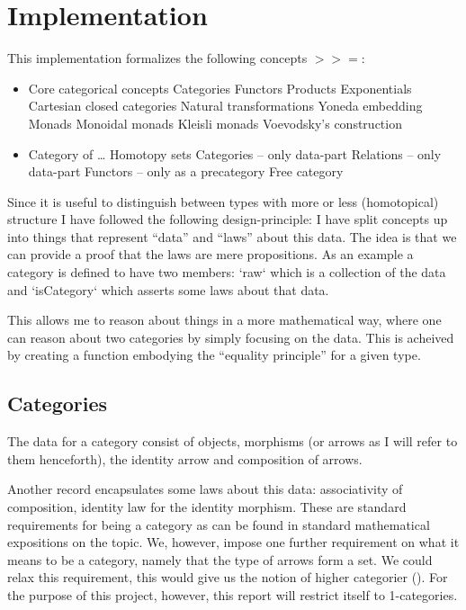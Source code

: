 \chapter{Implementation}
This implementation formalizes the following concepts $>\!\!>\!\!=$:
%
\begin{itemize}
\item Core categorical concepts
\subitem Categories
\subitem Functors
\subitem Products
\subitem Exponentials
\subitem Cartesian closed categories
\subitem Natural transformations
\subitem Yoneda embedding
\subitem Monads
\subsubitem Monoidal monads
\subsubitem Kleisli monads
\subsubitem Voevodsky's construction
\item Category of \ldots
\subitem Homotopy sets
\subitem Categories -- only data-part
\subitem Relations -- only data-part
\subitem Functors -- only as a precategory
\subitem Free category
\end{itemize}
%
Since it is useful to distinguish between types with more or less (homotopical)
structure I have followed the following design-principle: I have split concepts
up into things that represent ``data'' and ``laws'' about this data. The idea is
that we can provide a proof that the laws are mere propositions. As an example a
category is defined to have two members: `raw` which is a collection of the data
and `isCategory` which asserts some laws about that data.

This allows me to reason about things in a more mathematical way, where one can
reason about two categories by simply focusing on the data. This is acheived by
creating a function embodying the ``equality principle'' for a given type.

\section{Categories}
The data for a category consist of objects, morphisms (or arrows as I will refer
to them henceforth), the identity arrow and composition of arrows.

Another record encapsulates some laws about this data: associativity of
composition, identity law for the identity morphism. These are standard
requirements for being a category as can be found in standard mathematical
expositions on the topic. We, however, impose one further requirement on what it
means to be a category, namely that the type of arrows form a set. We could
relax this requirement, this would give us the notion of higher categorier
(\cite[p. 307]{hott-2013}). For the purpose of this project, however, this
report will restrict itself to 1-categories.


